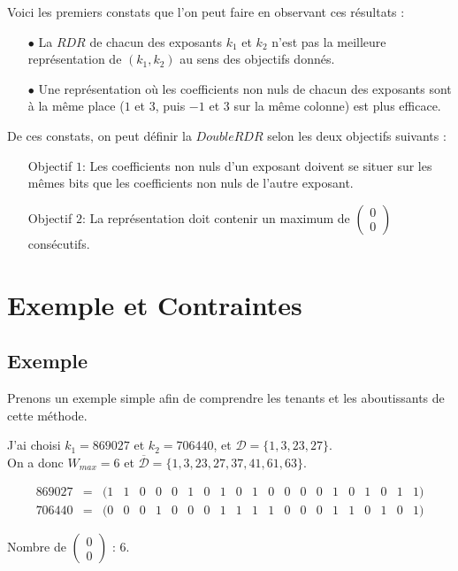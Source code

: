 \documentclass[12pt, a4paper]{memoir}
\newcommand{\doublezero}{\begin{pmatrix} 0 \\ 0 \end{pmatrix}}
\newcommand{\dbarre}{\overline{\mathcal{D}}}
\begin{document}
 \vspace{0.5cm}
 
 Voici les premiers constats que l'on peut faire en observant ces résultats : 
 \begin{itemize}
  \item [$\bullet$] La $RDR$ de chacun des exposants $k_1$ et $k_2$ n'est pas la meilleure représentation de
  $(k_1,k_2)$ au sens des objectifs donnés.
  \item [$\bullet$] Une représentation où les coefficients non nuls de chacun des exposants sont à la même place 
  ($1$ et $3$, puis $-1$ et $3$ sur la même colonne) est plus efficace.
 \end{itemize}

De ces constats, on peut définir la $DoubleRDR$ selon les deux objectifs suivants :
\begin{itemize}
 \item [Objectif $1$:] Les coefficients non nuls d'un exposant doivent se situer sur les mêmes bits 
 que les coefficients non nuls de l'autre exposant.
 \item [Objectif $2$:] La représentation doit contenir un maximum de $\doublezero$ consécutifs.
\end{itemize}

\section{Exemple et Contraintes}

\subsection{Exemple}

Prenons un exemple simple afin de comprendre les tenants et les aboutissants de cette méthode.

J'ai choisi $k_1 = 869027$ et $k_2 = 706440$, et $\mathcal{D} = \{1,3,23,27\}$. \\
On a donc $W_{max} = 6$ et $\dbarre = \{1,3,23,27,37,41,61,63\}$.

$$\begin{array}{cccccccccccccccccccccc}
  869027 & = & (1 & 1 & 0 & 0 & 0 & 1 & 0 & 1 & 0 & 1 & 0 & 0 & 0 & 0 & 1 & 0 & 1 & 0 & 1 & 1) \\
  706440 & = & (0 & 0 & 0 & 1 & 0 & 0 & 0 & 1 & 1 & 1 & 1 & 0 & 0 & 0 & 1 & 1 & 0 & 1 & 0 & 1)
 \end{array}$$
 
 Nombre de $\doublezero$ : $6$.
\end{document}
